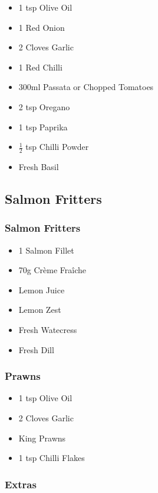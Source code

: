 \documentclass[11pt, english]{article}
\begin{document}
	\begin{itemize}
        \setlength\itemsep{0cm}
                \item 1 tsp Olive Oil
		\item 1 Red Onion
		\item 2 Cloves Garlic
		\item 1 Red Chilli
		\item 300ml Passata or Chopped Tomatoes
		\item 2 tsp Oregano
		\item 1 tsp Paprika
		\item $\frac{1}{2}$ tsp Chilli Powder
		\item Fresh Basil
        \end{itemize}

\newpage

	\subsection{Salmon Fritters}

		\subsubsection*{Salmon Fritters}

	\begin{itemize}
        \setlength\itemsep{0cm}
                \item 1 Salmon Fillet
		\item 70g Cr\`{e}me Fra\^{i}che
		\item Lemon Juice
		\item Lemon Zest
		\item Fresh Watecress
		\item Fresh Dill
        \end{itemize}

		\subsubsection*{Prawns}

	\begin{itemize}
        \setlength\itemsep{0cm}
                \item 1 tsp Olive Oil
		\item 2 Cloves Garlic
		\item King Prawns
		\item 1 tsp Chilli Flakes
        \end{itemize}

		\subsubsection*{Extras}
\end{document}
